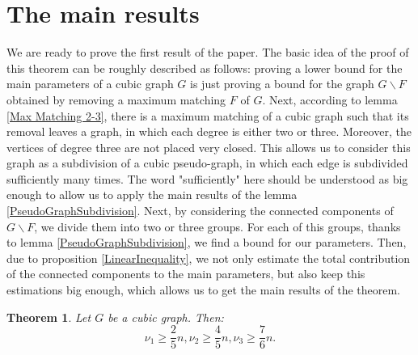 \documentclass[fleqn,12pt,twoside]{article}
\newtheorem{theorem}{Theorem}
\begin{document}
\section{The main results}

We are ready to prove the first result of the paper. The basic idea
of the proof of this theorem can be roughly described as follows:
proving a lower bound for the main parameters of a cubic graph $G$
is just proving a bound for the graph $G\backslash F$ obtained by
removing a maximum matching $F$ of $G$. Next, according to lemma
\ref{Max Matching 2-3}, there is a maximum matching of a cubic graph
such that its removal leaves a graph, in which each degree is either
two or three. Moreover, the vertices of degree three are not placed
very closed. This allows us to consider this graph as a subdivision
of a cubic pseudo-graph, in which each edge is subdivided
sufficiently many times. The word "sufficiently" here should be
understood as big enough to allow us to apply the main results of
the lemma \ref{PseudoGraphSubdivision}. Next, by considering the
connected components of $G\backslash F$, we divide them into two or
three groups. For each of this groups, thanks to lemma
\ref{PseudoGraphSubdivision}, we find a bound for our parameters.
Then, due to proposition \ref{LinearInequality}, we not only
estimate the total contribution of the connected components to the
main parameters, but also keep this estimations big enough, which
allows us to get the main results of the theorem.

\begin{theorem}
\label{MainTheoremCubics}Let $G$ be a cubic graph. Then:\begin{equation*}
\nu _{1}\geq \frac{2}{5}n ,\nu _{2}\geq \frac{4}{5}n ,\nu _{3}\geq \frac{7}{6}n.
\end{equation*}
\end{theorem}
\end{document}

